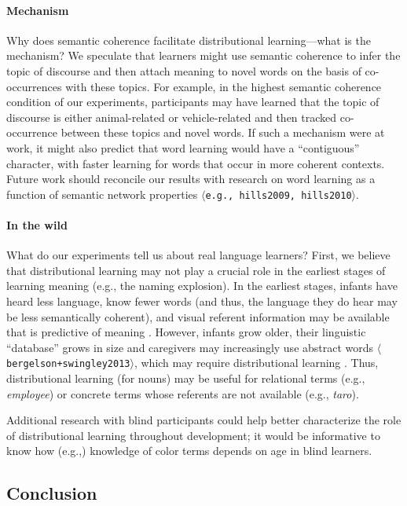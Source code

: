 \documentclass[man,floatsintext]{apa6}
\newcommand{\tcite}[1]{$\langle${\footnotesize \texttt{#1}}$\rangle$}
\begin{document}
\paragraph{Mechanism}
Why does semantic coherence facilitate distributional learning---what is the mechanism? We speculate that learners might use semantic coherence to infer the topic of discourse and then attach meaning to novel words on the basis of co-occurrences with these topics. For example, in the highest semantic coherence condition of our experiments, participants may have learned that the topic of discourse is either animal-related or vehicle-related and then tracked co-occurrence between these topics and novel words. If such a mechanism were at work, it might also predict that word learning would have a ``contiguous'' character, with faster learning for words that occur in more coherent contexts. Future work should reconcile our results with research on word learning as a function of semantic network properties \tcite{e.g., hills2009, hills2010}.

\paragraph{In the wild}
What do our experiments tell us about real language learners? First, we believe that distributional learning may not play a crucial role in the earliest stages of learning meaning (e.g., the naming explosion). In the earliest stages, infants  have heard less language, know fewer words (and thus, the language they do hear may be less semantically coherent), and visual referent information may be available that is predictive of meaning \citep{riordan2010}. However, infants grow older, their linguistic ``database'' grows in size and caregivers may increasingly use abstract words \tcite{bergelson+swingley2013}, which may require distributional learning \citep[cf. ][]{andrews2009}. Thus,  distributional learning (for nouns) may be useful for relational terms (e.g., \emph{employee}) or concrete terms whose referents are not available (e.g., \emph{taro}).

Additional research with blind participants \cite[cf.][]{shepard1992,bedny2012} could help better characterize the role of distributional learning throughout development; it would be informative to know how (e.g.,) knowledge of color terms depends on age in blind learners.


\subsection{Conclusion}
\end{document}
